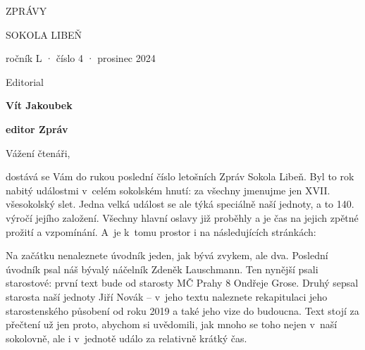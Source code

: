 \documentclass[11pt]{article}
\begin{document}
\pagecolor{sokolred}
\color{white}
\begin{center}

\vspace*{\fill}


{\titlesize \fugner ZPRÁVY}

{\titlesize \tyrs SOKOLA LIBEŇ}

\vspace*{1cm}

{\large ročník L · číslo 4 · prosinec 2024}

\vspace*{\fill}
\end{center}

\clearpage
\normalcolor
\nopagecolor
{}

\pagestyle{uvodnik}



\begin{multicols}{2}
  {\huge \tyrs \noindent Editorial}

  \columnbreak
 
  \vspace*{-14pt}

  {\hfill\textbf{Vít Jakoubek}}

  {\hfill\textbf{ editor Zpráv }}
\end{multicols}


\noindent
Vážení čtenáři, 

\noindent
dostává se Vám do rukou poslední číslo letošních Zpráv Sokola Libeň. Byl to rok nabitý událostmi v~celém sokolském hnutí: za všechny jmenujme jen XVII. všesokolský slet. Jedna velká událost se ale týká speciálně naší jednoty, a to 140. výročí jejího založení.  Všechny hlavní oslavy již proběhly a je čas na jejich zpětné prožití a vzpomínání. A~je k~tomu prostor i na následujících stránkách: 

Na začátku nenaleznete úvodník jeden, jak bývá zvykem, ale dva. Poslední úvodník psal náš bývalý náčelník Zdeněk Lauschmann. Ten nynější psali starostové: první text bude od starosty MČ Prahy 8 Ondřeje Grose. Druhý sepsal starosta naší jednoty Jiří Novák – v~jeho textu naleznete rekapitulaci jeho starostenského působení od roku 2019 a také jeho vize do budoucna. Text stojí za přečtení už jen proto, abychom si uvědomili, jak mnoho se toho nejen v~naší sokolovně, ale i v~jednotě událo za relativně krátký čas. 
\end{document}
